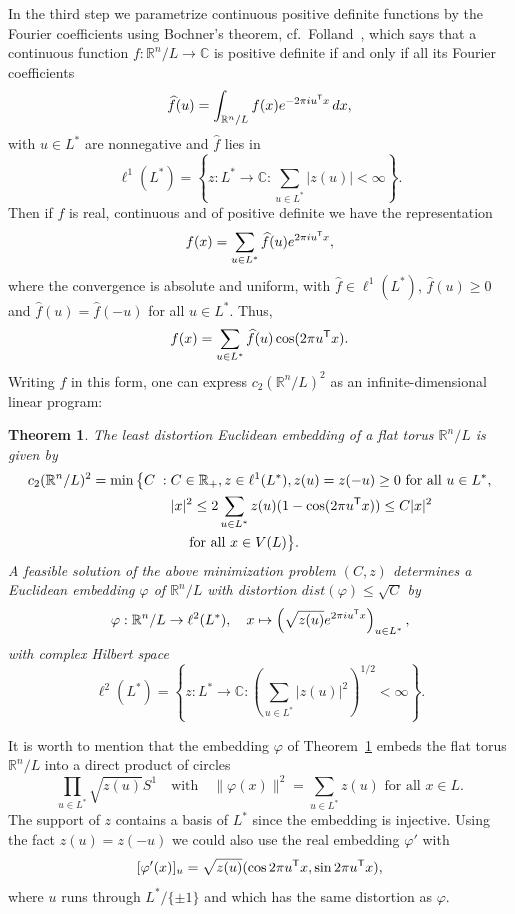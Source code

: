 \documentclass{amsart}
\newtheorem{theorem}[defin]{Theorem}
\newcommand{\C}{\mathbb{C}}
\newcommand{\R}{\mathbb{R}}
\begin{document}
In the third step we parametrize continuous positive definite functions by
the Fourier coefficients using Bochner's theorem, cf.\
Folland~\cite[(4.18)]{Folland1995a}, which says that a continuous
function $f : \R^n / L \to \C$ is positive definite if and only if all its
Fourier coefficients
\[
\widehat{f}(u) = \int_{\R^n/L} f(x) e^{-2\pi i u^{\sf T} x} \, dx,
\]
with $u \in L^*$ are nonnegative and $\widehat{f}$ lies in
\[
  \ell^1(L^*) = \left\{ z \colon L^* \to \C : \sum_{u \in L^*} |z(u)| < \infty \right\}.
\]
Then if $f$ is real, continuous and
of positive definite we have the representation
\[
  f(x) = \sum_{u \in L^*} \widehat{f}(u) e^{2\pi i u^{\sf T} x},
\]
where the convergence is absolute and uniform, with $\widehat{f} \in
\ell^1(L^*)$, $\widehat{f}(u) \geq 0$ and $\widehat{f}(u) =
\widehat{f}(-u)$ for all $u \in L^*$. Thus,
\[
  f(x) = \sum_{u \in L^* } \widehat{f}(u) \cos(2\pi u^{\sf T} x).
\]
Writing $ f $ in this form, one can express $c_2(\R^n / L)^2$ as an infinite-dimensional
linear program:

\begin{theorem}
\label{thm:primal-sym}
  The least distortion Euclidean embedding of a flat torus $\R^n / L$
  is given by
  \begin{equation}
  \label{eq:primal}
  \begin{split}
  c_2(\R^n/L)^2 = \min\big\{C \; : \; & C \in \R_+, z \in \ell^1(L^*),
  z(u) = z(-u) \geq 0 \text{ for all } u \in L^*,\\
&  |x|^2 \leq 2 \sum_{u \in L^*} z(u) (1- \cos(2\pi u^{\sf T} x))\leq C
|x|^2\\
& \quad \text{ for all } x \in V(L)\big\}.
  \end{split}
\end{equation}
A feasible solution of the above minimization problem $(C,z)$
determines a Euclidean embedding $\varphi$ of $\R^n/L$ with distortion
$dist(\varphi) \leq \sqrt{C}$ by
\begin{equation}
  \label{eq:varphi-embedding}
   \varphi : \R^n/L \to \ell^2(L^*), \quad
    x  \mapsto \left(\sqrt{z(u)} e^{2\pi i u^{\sf T} x} \right)_{u \in L^*},
  \end{equation}
  with complex Hilbert space
\[
  \ell^2(L^*) = \left\{z : L^* \to \C : \left(\sum_{u \in L^*} |z(u)|^2 \right)^{1/2} < \infty\right\}.
\]
\end{theorem}

It is worth to mention that the embedding $\varphi$ of
Theorem~\ref{thm:primal-sym} embeds the flat torus $\R^n / L$ into a
direct product of circles
\[
  \prod_{u \in L^*} \sqrt{z(u)} S^1 \quad \text{with} \quad
  \|\varphi(x)\|^2 = \sum_{u \in L^*} z(u) \text{ for all } x \in L.
\]
The support of $z$ contains a basis of $L^*$ since the embedding is injective.
Using the fact $z(u) = z(-u)$ we could also use the real embedding
$\varphi'$ with
\[
  [\varphi'(x)]_u = \sqrt{z(u)} (\cos 2\pi u^{\sf T} x, \sin 2\pi u^{\sf
    T} x),
\]
where $u$ runs through $L^* / \{\pm 1\}$ and which has the same
distortion as $\varphi$.
\end{document}
